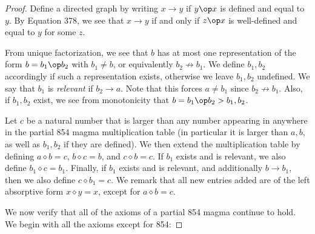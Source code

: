 \begin{proof}  Define a directed graph by writing $x \to y$ if $y \op x$ is defined and equal to $y$.  By Equation 378, we see that $x \to y$ if and only if $z \op x$ is well-defined and equal to $y$ for some $z$.

  From unique factorization, we see that $b$ has at most one representation of the form $b = b_1 \op b_2$ with $b_1 \neq b$, or equivalently $b_2 \not \to b_1$.  We define $b_1, b_2$ accordingly if such a representation exists, otherwise we leave $b_1, b_2$ undefined.  We say that $b_1$ is \emph{relevant} if $b_2 \to a$. Note that this forces $a \neq b_1$ since $b_2 \not \to b_1$.  Also, if $b_1,b_2$ exist, we see from monotonicity that $b = b_1 \op b_2 > b_1, b_2$.

  Let $c$ be a natural number that is larger than any number appearing in anywhere in the partial 854 magma multiplication table (in particular it is larger than $a,b$, as well as $b_1,b_2$ if they are defined).  We then extend the multiplication table by  defining $a \diamond b = c$, $b \diamond c = b$, and $c \diamond b = c$.  If $b_1$ exists and is relevant, we also define $b_1 \diamond c = b_1$.  Finally, if $b_1$ exists and is relevant, and additionally $b \to b_1$, then we also define $c \diamond b_1 = c$.  We remark that all new entries added are of the left absorptive form $x \diamond y = x$, except for $a \diamond b = c$.

We now verify that all of the axioms of a partial 854 magma continue to hold.  We begin with all the axioms except for 854:


\end{proof}

